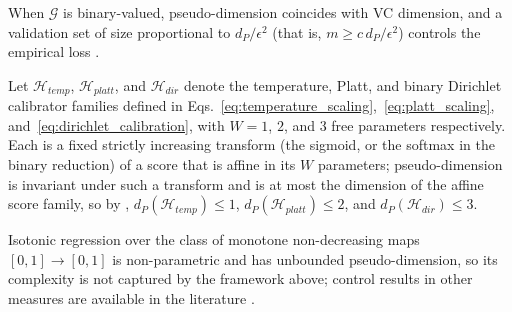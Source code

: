 When $\mathcal{G}$ is binary-valued, pseudo-dimension coincides with VC dimension, and a validation set of size proportional to $d_P/\epsilon^2$ (that is, $m \geq c\, d_P/\epsilon^2$) controls the empirical loss \citep[Chapter~19]{anthony1999neural}.

\begin{proposition}\label{prop:calibrator_complexity}
Let $\mathcal{H}_{temp}$, $\mathcal{H}_{platt}$, and $\mathcal{H}_{dir}$ denote the temperature, Platt, and binary Dirichlet calibrator families defined in Eqs.~\eqref{eq:temperature_scaling},~\eqref{eq:platt_scaling}, and~\eqref{eq:dirichlet_calibration}, with $W = 1$, $2$, and $3$ free parameters respectively. Each is a fixed strictly increasing transform (the sigmoid, or the softmax in the binary reduction) of a score that is affine in its $W$ parameters; pseudo-dimension is invariant under such a transform and is at most the dimension of the affine score family, so by \citet[Theorems~11.3 and~11.4]{anthony1999neural}, $d_P(\mathcal{H}_{temp}) \leq 1$, $d_P(\mathcal{H}_{platt}) \leq 2$, and $d_P(\mathcal{H}_{dir}) \leq 3$.
\end{proposition}

Isotonic regression over the class of monotone non-decreasing maps $[0,1] \to [0,1]$ is non-parametric and has unbounded pseudo-dimension, so its complexity is not captured by the framework above; control results in other measures are available in the literature \citep{meyer2000degrees, zhang2002risk}.
